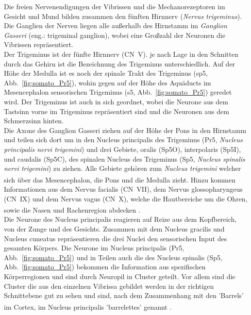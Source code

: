 \documentclass[12pt,a4paper,pdftex]{article}
\begin{document}
Die freien Nervenendigungen der Vibrissen und die Mechanorezeptoren im Gesicht und Mund bilden zusammen den fünften Hirnnerv (\textit{Nervus trigeminus}). Die Ganglien der Nerven liegen alle außerhalb des Hirnstamm im \textit{Ganglion Gasseri} (eng.: trigeminal ganglion), wobei eine Großzahl der Neuronen die Vibrissen repräsentiert.
\\
\noindent
Der Trigeminus ist der fünfte Hirnnerv (CN~V). je nach Lage in den Schnitten durch das Gehirn ist die Bezeichnung des Trigeminus unterschiedlich. Auf der Höhe der Medulla ist es noch der spinale Trakt des Trigeminus (sp5, Abb.~\ref{fig:somato_Pr5}), wohin gegen auf der Höhe des Aquäducts im Mesencephalon sensorischen Trigeminus  (s5, Abb.~\ref{fig:somato_Pr5}) geredet wird. Der Trigeminus ist auch in sich geordnet, wobei die Neurone aus dem Tastsinn vorne im Trigeminus repräsentiert sind und die Neuronen aus dem Schmerzsinn hinten.
\\
\noindent
Die Axone des Ganglion Gasseri ziehen auf der Höhe der Pons in den Hirnstamm und teilen sich dort um in den Nucleus principalis des Trigeminus (Pr5, \textit{Nucleus principalis nervi trigemini})  und drei Gebiete, oralis (Sp5O), interpolaris (Sp5I), und caudalis (Sp5C), des spinalen Nucleus des Trigeminus (Sp5, \textit{Nucleus spinalis nervi trigemini}) zu ziehen. Alle Gebiete gehören zum \textit{Nucleus trigemini} welcher sich über das Mesencephalon, die Pons und die Medulla zieht\textsuperscript{\cite[5]{heldmaier2003tierphysiologie}}. 
Hinzu kommen Informationen aus dem Nervus facialis (CN~VII), dem Nervus glossopharyngeus  (CN~IX) und dem Nervus vagus (CN~X), welche die Hautbereiche um die Ohren, sowie die Nasen und Rachenregion abdecken
\textsuperscript{\cite[12]{neurowissenschaften_baer}}.
\\
\noindent Die Neurone des Nucleus principalis reagieren auf Reize aus dem Kopfbereich, von der Zunge und des Gesichts. Zusammen mit dem Nucleus gracilis und Nucleus cuneatus repräsentieren die drei Nuclei den sensorischen Input des gesamten Körpers. Die Neurone im Nucleus principalis (Pr5, Abb.~\ref{fig:somato_Pr5}) und in Teilen auch die des Nucleus spinalis (Sp5, Abb.~\ref{fig:somato_Pr5}) bekommen die Information aus spezifischen Körperregionen und sind durch Neuropil in Cluster geteilt. Vor allem sind die Cluster die aus den einzelnen Vibrissa gebildet werden in der richtigen Schnittebene gut zu sehen und sind, nach dem Zusammenhang mit den 'Barrels' im Cortex, im Nucleus principalis 'barrelettes' genannt \textsuperscript{\cite[5]{heldmaier2003tierphysiologie}}.
\end{document}
